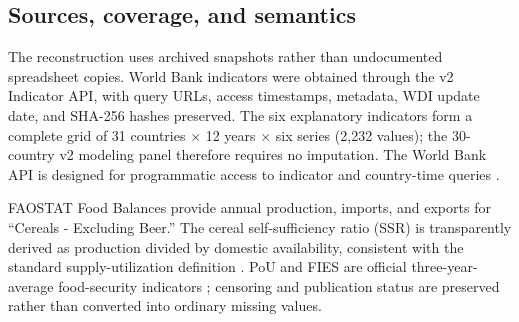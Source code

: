 \documentclass[11pt]{article}
\begin{document}
\subsection{Sources, coverage, and semantics}

The reconstruction uses archived snapshots rather than undocumented spreadsheet copies. World Bank indicators were obtained through the v2 Indicator API, with query URLs, access timestamps, metadata, WDI update date, and SHA-256 hashes preserved. The six explanatory indicators form a complete grid of 31 countries $\times$ 12 years $\times$ six series (2,232 values); the 30-country v2 modeling panel therefore requires no imputation. The World Bank API is designed for programmatic access to indicator and country-time queries \cite{worldbankapi,worldbankqueries}.

FAOSTAT Food Balances provide annual production, imports, and exports for ``Cereals - Excluding Beer.'' The cereal self-sufficiency ratio (SSR) is transparently derived as production divided by domestic availability, consistent with the standard supply-utilization definition \cite{faohandbook,faofbs}. PoU and FIES are official three-year-average food-security indicators \cite{faohunger}; censoring and publication status are preserved rather than converted into ordinary missing values.
\end{document}
